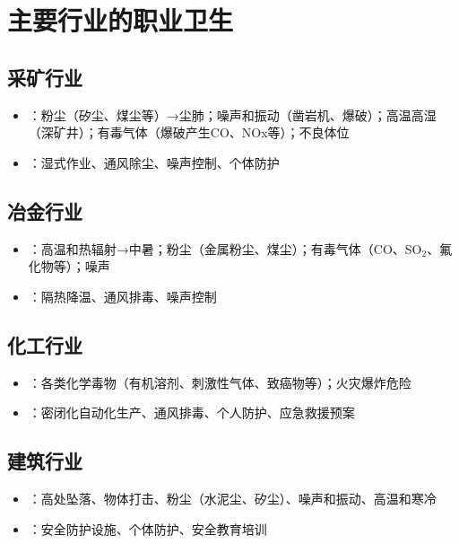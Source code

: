 \chapter{主要行业的职业卫生}
\setcounter{chapter}{12}

\section{采矿行业}

\begin{itemize}[leftmargin=*]
    \item {}：粉尘（矽尘、煤尘等）→尘肺；噪声和振动（凿岩机、爆破）；高温高湿（深矿井）；有毒气体（爆破产生CO、NOx等）；不良体位
    \item {}：湿式作业、通风除尘、噪声控制、个体防护
\end{itemize}

\section{冶金行业}

\begin{itemize}[leftmargin=*]
    \item {}：高温和热辐射→中暑；粉尘（金属粉尘、煤尘）；有毒气体（CO、SO$_2$、氟化物等）；噪声
    \item {}：隔热降温、通风排毒、噪声控制
\end{itemize}

\section{化工行业}

\begin{itemize}[leftmargin=*]
    \item {}：各类化学毒物（有机溶剂、刺激性气体、致癌物等）；火灾爆炸危险
    \item {}：密闭化自动化生产、通风排毒、个人防护、应急救援预案
\end{itemize}

\section{建筑行业}

\begin{itemize}[leftmargin=*]
    \item {}：高处坠落、物体打击、粉尘（水泥尘、矽尘）、噪声和振动、高温和寒冷
    \item {}：安全防护设施、个体防护、安全教育培训
\end{itemize}

